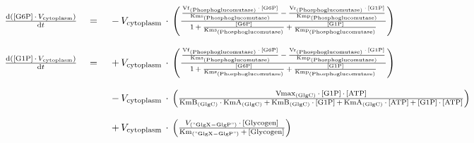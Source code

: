 
$$
\begin{array}{ccl}
\frac {\mathrm{d}\left( {{\mathrm{[G6P]}} \, \cdot \, {V}_{\mathrm{cytoplasm}} } \right) }  {\mathrm{d}{t} }  \; &=& \;  { \, - \, {V}_{\mathrm{cytoplasm}} \, \cdot \, \left(\frac {\frac {{\mathrm{Vf}}_{\mathrm{(Phosphoglucomutase)}} \, \cdot \, {\mathrm{[G6P]}} } {{\mathrm{Kms}}_{\mathrm{(Phosphoglucomutase)}} } \, - \, \frac {{\mathrm{Vr}}_{\mathrm{(Phosphoglucomutase)}} \, \cdot \, {\mathrm{[G1P]}} } {{\mathrm{Kmp}}_{\mathrm{(Phosphoglucomutase)}} } }  { {{1} \, + \, \frac{\mathrm{[G6P]}}{{\mathrm{Kms}}_{\mathrm{(Phosphoglucomutase)}} } }  \, + \, \frac{\mathrm{[G1P]}}{{\mathrm{Kmp}}_{\mathrm{(Phosphoglucomutase)}} } } \right) } \\ 
 && \\ 
\frac {\mathrm{d}\left( {{\mathrm{[G1P]}} \, \cdot \, {V}_{\mathrm{cytoplasm}} } \right) }  {\mathrm{d}{t} }  \; &=& \;  { \, + \, {V}_{\mathrm{cytoplasm}} \, \cdot \, \left(\frac {\frac {{\mathrm{Vf}}_{\mathrm{(Phosphoglucomutase)}} \, \cdot \, {\mathrm{[G6P]}} } {{\mathrm{Kms}}_{\mathrm{(Phosphoglucomutase)}} } \, - \, \frac {{\mathrm{Vr}}_{\mathrm{(Phosphoglucomutase)}} \, \cdot \, {\mathrm{[G1P]}} } {{\mathrm{Kmp}}_{\mathrm{(Phosphoglucomutase)}} } }  { {{1} \, + \, \frac{\mathrm{[G6P]}}{{\mathrm{Kms}}_{\mathrm{(Phosphoglucomutase)}} } }  \, + \, \frac{\mathrm{[G1P]}}{{\mathrm{Kmp}}_{\mathrm{(Phosphoglucomutase)}} } } \right) } \\ 
 && \\ 
 \; && \;  { \, - \, {V}_{\mathrm{cytoplasm}} \, \cdot \, \left(\frac { {{\mathrm{Vmax}}_{\mathrm{(GlgC)}} \, \cdot \, {\mathrm{[G1P]}} }  \, \cdot \, {\mathrm{[ATP]}} }  { { { {{\mathrm{KmB}}_{\mathrm{(GlgC)}} \, \cdot \, {\mathrm{KmA}}_{\mathrm{(GlgC)}} }  \, + \,  {{\mathrm{KmB}}_{\mathrm{(GlgC)}} \, \cdot \, {\mathrm{[G1P]}} }  }  \, + \,  {{\mathrm{KmA}}_{\mathrm{(GlgC)}} \, \cdot \, {\mathrm{[ATP]}} }  }  \, + \,  {{\mathrm{[G1P]}} \, \cdot \, {\mathrm{[ATP]}} }  } \right) } \\ 
 && \\ 
 \; && \;  { \, + \, {V}_{\mathrm{cytoplasm}} \, \cdot \, \left(\frac {{V}_{\mathrm{("GlgX-GlgP")}} \, \cdot \, {\mathrm{[Glycogen]}} }  {{\mathrm{Km}}_{\mathrm{("GlgX-GlgP")}} \, + \, {\mathrm{[Glycogen]}} } \right) } \\ 

\end{array}$$
